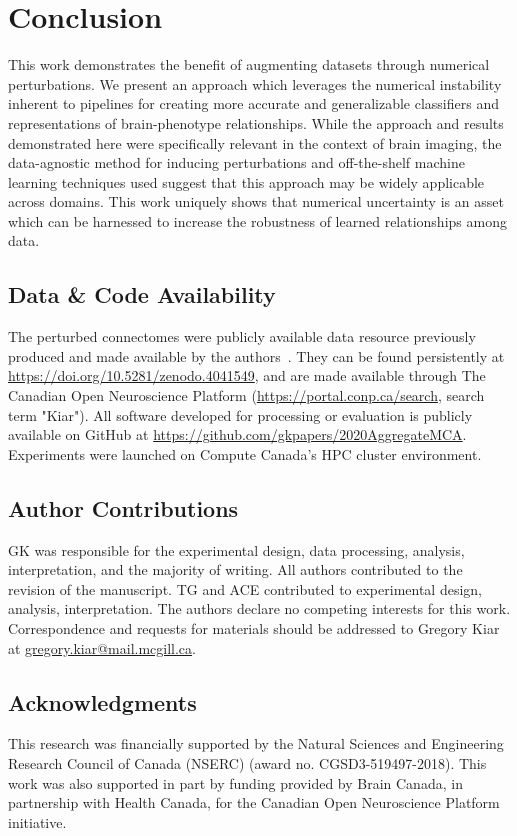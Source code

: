 \documentclass[10pt]{SelfArx} %
\begin{document}
\section*{Conclusion}

This work demonstrates the benefit of augmenting datasets through numerical perturbations. We present an approach which
leverages the numerical instability inherent to pipelines for creating more accurate and generalizable classifiers and
representations of brain-phenotype relationships. While the approach and results demonstrated here were specifically
relevant in the context of brain imaging, the data-agnostic method for inducing perturbations and off-the-shelf machine
learning techniques used suggest that this approach may be widely applicable across domains. This work uniquely shows
that numerical uncertainty is an asset which can be harnessed to increase the robustness of learned relationships among
data.


\subsection*{Data \& Code Availability}
The perturbed connectomes were publicly available data resource previously produced and made available by the
authors~\cite{Kiar2020-yz}. They can be found persistently at \url{https://doi.org/10.5281/zenodo.4041549}, and are
made available through The Canadian Open Neuroscience Platform (\url{https://portal.conp.ca/search}, search term
"Kiar"). All software developed for processing or evaluation is publicly available on GitHub at
\url{https://github.com/gkpapers/2020AggregateMCA}. Experiments were launched on Compute Canada's HPC cluster
environment. 

\subsection*{Author Contributions}
GK was responsible for the experimental design, data processing, analysis, interpretation, and the majority of writing.
All authors contributed to the revision of the manuscript. TG and ACE contributed to experimental design, analysis,
interpretation. The authors declare no competing interests for this work. Correspondence and requests for materials
should be addressed to Gregory Kiar at \url{gregory.kiar@mail.mcgill.ca}.

\subsection*{Acknowledgments} 
This research was financially supported by the Natural Sciences and Engineering Research Council of Canada (NSERC)
(award no. CGSD3-519497-2018). This work was also supported in part by funding provided by Brain Canada, in partnership
with Health Canada, for the Canadian Open Neuroscience Platform initiative.



\end{document}
